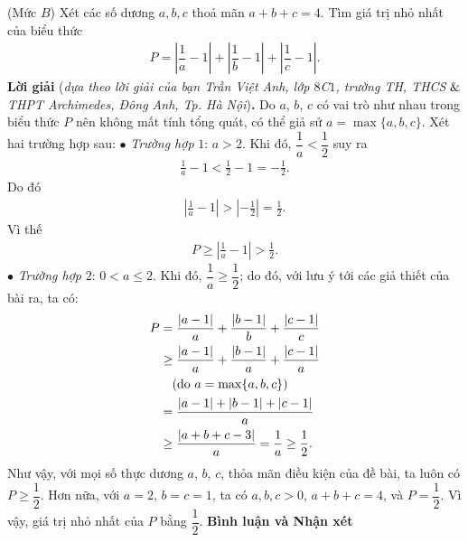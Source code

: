 \begin{multicols}{2}
	(Mức $B$) Xét các số dương $a,b,c$ thoả mãn $a+b+c=4$. Tìm giá trị nhỏ nhất của biểu thức 
	\begin{align*}
		P=\left|\dfrac 1a-1\right|+\left|\dfrac 1b-1\right|+\left|\dfrac 1c-1\right|.
	\end{align*}
	\textbf{\color{thachthuctoanhoc}Lời giải} (\textit{dựa theo lời giải của bạn Trần Việt Anh, lớp $8$C$1$, trường TH, THCS $\color{black}\&$ THPT Archimedes, Đông Anh, Tp. Hà Nội})\textbf{\color{thachthuctoanhoc}.}
	\vskip 0.05cm
	Do $a$, $b$, $c$ có vai trò như nhau trong biểu thức $P$ nên không mất tính tổng quát, có thể giả sử $a = \max\{a, b, c\}$.
	\vskip 0.05cm
	Xét hai trường hợp sau:
	\vskip 0.05cm
	$\bullet$ \textit{Trường hợp} $1$: $a > 2$.
	\vskip 0.05cm
	Khi đó, $\dfrac{1}{a} < \dfrac{1}{2}$  suy ra
	\begin{align*}
		\frac{1}{a} - 1 < \frac{1}{2} - 1 =  - \frac{1}{2}.
	\end{align*}
	Do đó
	\begin{align*}
		\left| {\frac{1}{a} - 1} \right| > \left| { - \frac{1}{2}} \right| = \frac{1}{2}.
	\end{align*}
	Vì thế
	\begin{align*}
		P \ge \left| {\frac{1}{a} - 1} \right| > \frac{1}{2}.
	\end{align*}
	$\bullet$ \textit{Trường hợp} $2$: $0 < a \le 2$.
	\vskip 0.05cm
	Khi đó, $\dfrac{1}{a} \ge \dfrac{1}{2}$; do đó, với lưu ý tới các giả thiết của bài ra, ta có:
	\begin{align*}
			P &= \frac{{\left| {a - 1} \right|}}{a} + \frac{{\left| {b - 1} \right|}}{b} + \frac{{\left| {c - 1} \right|}}{c} \\
			&\ge \frac{{\left| {a - 1} \right|}}{a} + \frac{{\left| {b - 1} \right|}}{a} + \frac{{\left| {c - 1} \right|}}{a}\\
			&\quad({\text{\color{black} do } } a = \max \{ a,b,c\} )\\
			 &= \frac{{\left| {a - 1} \right| + \left| {b - 1} \right| + \left| {c - 1} \right|}}{a} \\
			 &\ge \frac{{\left| {a + b + c - 3} \right|}}{a} = \frac{1}{a} \ge \frac{1}{2}.
	\end{align*}
	Như vậy, với mọi số thực dương $a$, $b$, $c$, thỏa mãn điều kiện của đề bài, ta luôn có  $P \ge \dfrac{1}{2}$.
	\vskip 0.05cm
	Hơn nữa, với $a \!=\! 2$, $b \!=\! c \!=\! 1$, ta có $a, b, c \!>\! 0$, $a + b + c = 4$, và  $P = \dfrac{1}{2}$.
	\vskip 0.05cm
	Vì vậy, giá trị nhỏ nhất của $P$ bằng  $\dfrac{1}{2}$.
	\vskip 0.05cm
	\textbf{\color{thachthuctoanhoc}Bình luận và Nhận xét}

\end{multicols}
